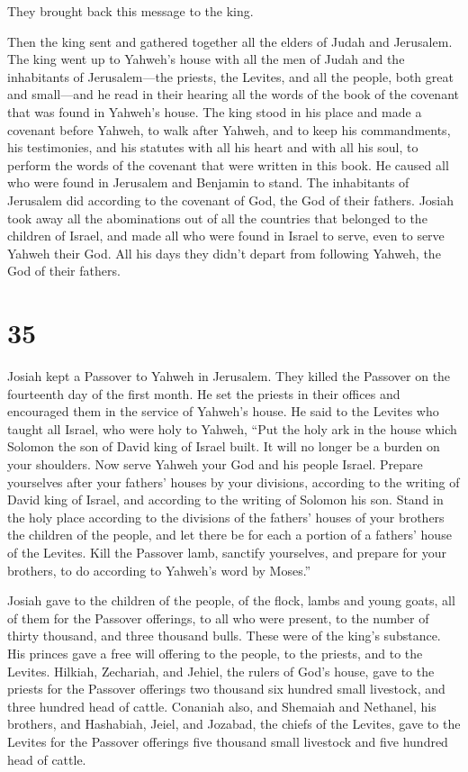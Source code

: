 They brought back this message to the king.

 Then the king sent and gathered together all the elders
of Judah and Jerusalem.  The king went up to Yahweh's
house with all the men of Judah and the inhabitants of Jerusalem---the
priests, the Levites, and all the people, both great and small---and he
read in their hearing all the words of the book of the covenant that was
found in Yahweh's house.  The king stood in his place and
made a covenant before Yahweh, to walk after Yahweh, and to keep his
commandments, his testimonies, and his statutes with all his heart and
with all his soul, to perform the words of the covenant that were
written in this book.  He caused all who were found in
Jerusalem and Benjamin to stand. The inhabitants of Jerusalem did
according to the covenant of God, the God of their fathers.
 Josiah took away all the abominations out of all the
countries that belonged to the children of Israel, and made all who were
found in Israel to serve, even to serve Yahweh their God. All his days
they didn't depart from following Yahweh, the God of their fathers.

\hypertarget{section-34}{%
\section{35}\label{section-34}}

 Josiah kept a Passover to Yahweh in Jerusalem. They
killed the Passover on the fourteenth day of the first month.
 He set the priests in their offices and encouraged them
in the service of Yahweh's house.  He said to the Levites
who taught all Israel, who were holy to Yahweh, ``Put the holy ark in
the house which Solomon the son of David king of Israel built. It will
no longer be a burden on your shoulders. Now serve Yahweh your God and
his people Israel.  Prepare yourselves after your fathers'
houses by your divisions, according to the writing of David king of
Israel, and according to the writing of Solomon his son. 
Stand in the holy place according to the divisions of the fathers'
houses of your brothers the children of the people, and let there be for
each a portion of a fathers' house of the Levites.  Kill
the Passover lamb, sanctify yourselves, and prepare for your brothers,
to do according to Yahweh's word by Moses.''

 Josiah gave to the children of the people, of the flock,
lambs and young goats, all of them for the Passover offerings, to all
who were present, to the number of thirty thousand, and three thousand
bulls. These were of the king's substance.  His princes
gave a free will offering to the people, to the priests, and to the
Levites. Hilkiah, Zechariah, and Jehiel, the rulers of God's house, gave
to the priests for the Passover offerings two thousand six hundred small
livestock, and three hundred head of cattle.  Conaniah
also, and Shemaiah and Nethanel, his brothers, and Hashabiah, Jeiel, and
Jozabad, the chiefs of the Levites, gave to the Levites for the Passover
offerings five thousand small livestock and five hundred head of cattle.


